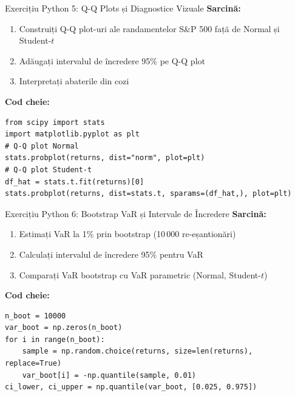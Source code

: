 \documentclass[9pt, aspectratio=169, t]{beamer}
\begin{document}
\begin{frame}[fragile]{Exercițiu Python 5: Q-Q Plots și Diagnostice Vizuale}
    \textbf{Sarcină:}
    \begin{enumerate}\setlength{\itemsep}{0pt}
        \item Construiți Q-Q plot-uri ale randamentelor S\&P 500 față de Normal și Student-$t$
        \item Adăugați intervalul de încredere 95\% pe Q-Q plot
        \item Interpretați abaterile din cozi
    \end{enumerate}

    \vspace{0.3cm}
    \textbf{Cod cheie:}
    \begin{verbatim}
from scipy import stats
import matplotlib.pyplot as plt
# Q-Q plot Normal
stats.probplot(returns, dist="norm", plot=plt)
# Q-Q plot Student-t
df_hat = stats.t.fit(returns)[0]
stats.probplot(returns, dist=stats.t, sparams=(df_hat,), plot=plt)
    \end{verbatim}

\end{frame}

\begin{frame}[fragile]{Exercițiu Python 6: Bootstrap VaR și Intervale de Încredere}
    \textbf{Sarcină:}
    \begin{enumerate}\setlength{\itemsep}{0pt}
        \item Estimați VaR la 1\% prin bootstrap (10\,000 re-eșantionări)
        \item Calculați intervalul de încredere 95\% pentru VaR
        \item Comparați VaR bootstrap cu VaR parametric (Normal, Student-$t$)
    \end{enumerate}

    \vspace{0.3cm}
    \textbf{Cod cheie:}
    \begin{verbatim}
n_boot = 10000
var_boot = np.zeros(n_boot)
for i in range(n_boot):
    sample = np.random.choice(returns, size=len(returns), replace=True)
    var_boot[i] = -np.quantile(sample, 0.01)
ci_lower, ci_upper = np.quantile(var_boot, [0.025, 0.975])
    \end{verbatim}

\end{frame}
\end{document}
